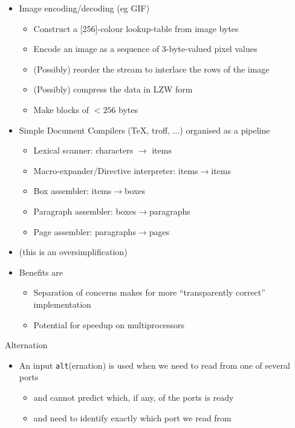 \documentclass{concdistfoils}
\def\heading#1{\begin{cframed}[8.8in]{#1}\end{cframed}}
\begin{document}
\begin{slide}
\begin{itemize}
\item Image encoding/decoding (eg GIF)
\begin{itemize}
\item Construct a [256]-colour lookup-table from image bytes
\item Encode an image as a sequence of 3-byte-valued pixel values
\item (Possibly) reorder the stream to interlace the rows of the image
\item (Possibly) compress the data in LZW form
\item Make blocks of $< 256$ bytes
\end{itemize}
\vfill
\item Simple Document Compilers (TeX, troff, ...) organised as a pipeline
\begin{itemize}
\item Lexical scanner: characters $\longrightarrow$ items
\item Macro-expander/Directive interpreter:  items$\longrightarrow$items
\item Box assembler:   items$\longrightarrow$boxes
\item Paragraph assembler: boxes$\longrightarrow$paragraphs
\item Page assembler: paragraphs$\longrightarrow$pages
\end{itemize}
\item[] (this is an oversimplification)
\end{itemize}
\newexpage
%
\end{slide}

\begin{slide}
\begin{itemize}
\item Benefits are
\begin{itemize}
\item Separation of concerns makes for more ``transparently correct'' implementation
\item Potential for speedup on multiprocessors
\end{itemize}
\end{itemize}
\end{slide}

\begin{slide}
\heading{Alternation}
\vfill

\begin{itemize}
\item An input \texttt{alt}(ernation) is used when we need to read from one of several ports
\begin{itemize}
\item and cannot predict which, if any, of the ports is ready
\item and need to identify exactly which port we read from
\end{itemize}
\end{itemize}
\end{slide}
\end{document}
